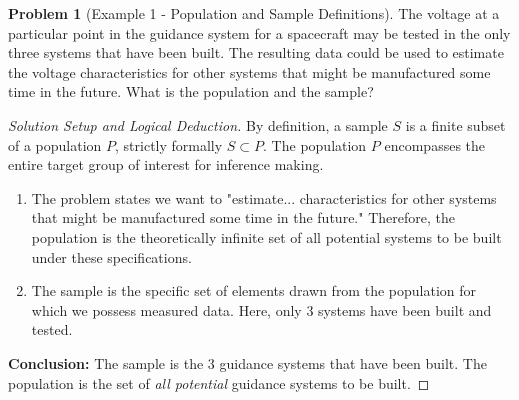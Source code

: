 \documentclass[11pt]{article}
\theoremstyle{definition}
\newtheorem{problem}{Problem}
\theoremstyle{remark}
\begin{document}
\begin{problem}[Example 1 - Population and Sample Definitions]
The voltage at a particular point in the guidance system for a spacecraft may be tested in the only three systems that have been built. The resulting data could be used to estimate the voltage characteristics for other systems that might be manufactured some time in the future. What is the population and the sample?
\end{problem}
\begin{proof}[Solution Setup and Logical Deduction]
By definition, a sample $S$ is a finite subset of a population $P$, strictly formally $S \subset P$. The population $P$ encompasses the entire target group of interest for inference making.
\begin{enumerate}
    \item The problem states we want to "estimate... characteristics for other systems that might be manufactured some time in the future." Therefore, the population is the theoretically infinite set of all potential systems to be built under these specifications.
    \item The sample is the specific set of elements drawn from the population for which we possess measured data. Here, only 3 systems have been built and tested.
\end{enumerate}
\textbf{Conclusion:} 
The sample is the $3$ guidance systems that have been built. 
The population is the set of \textit{all potential} guidance systems to be built.
\end{proof}
\end{document}
